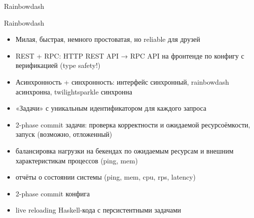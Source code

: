 \documentclass[10pt]{beamer}
\begin{document}
\begin{frame}
  \begin{center}
    \Large
    Rainbowdash
  \end{center}
\end{frame}

\begin{frame}[plain]
\end{frame}

\begin{frame}{Rainbowdash}
  \begin{itemize}
    \item Милая, быстрая, немного простоватая, но reliable для друзей
    \item REST + RPC: HTTP REST API → RPC API на фронтенде по конфигу с верификацией (type safety!)
    \item Асинхронность + синхронность: интерфейс синхронный, rainbowdash асинхронна, twilightsparkle синхронна
    \item «Задачи» с уникальным идентификатором для каждого запроса
    \item 2-phase commit задачи: проверка корректности и ожидаемой ресурсоёмкости, запуск (возможно, отложенный)
    \item балансировка нагрузки на бекендах по ожидаемым ресурсам и внешним характеристикам процессов (ping, mem)
    \item отчёты о состоянии системы (ping, mem, cpu, rps, latency)
    \item 2-phase commit конфига
    \item live reloading Haskell-кода с персистентными задачами
  \end{itemize}
\end{frame}
\end{document}
